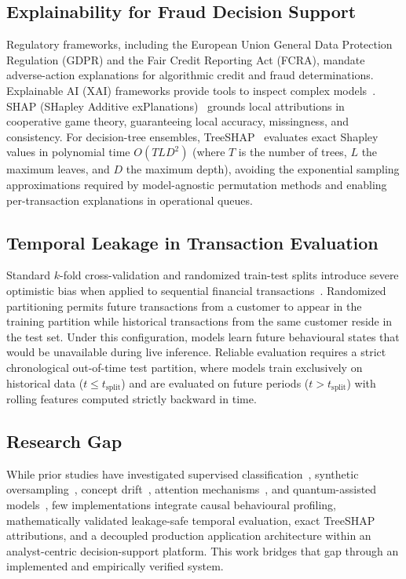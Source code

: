 \documentclass[conference]{IEEEtran}
\begin{document}
\subsection{Explainability for Fraud Decision Support}
Regulatory frameworks, including the European Union General Data Protection Regulation (GDPR) and the Fair Credit Reporting Act (FCRA), mandate adverse-action explanations for algorithmic credit and fraud determinations. Explainable AI (XAI) frameworks provide tools to inspect complex models~\cite{lipton2016mythos}. SHAP (SHapley Additive exPlanations)~\cite{lundberg2017unified} grounds local attributions in cooperative game theory, guaranteeing local accuracy, missingness, and consistency. For decision-tree ensembles, TreeSHAP~\cite{lundberg2020local} evaluates exact Shapley values in polynomial time $O(T L D^2)$ (where $T$ is the number of trees, $L$ the maximum leaves, and $D$ the maximum depth), avoiding the exponential sampling approximations required by model-agnostic permutation methods and enabling per-transaction explanations in operational queues.

\subsection{Temporal Leakage in Transaction Evaluation}
Standard $k$-fold cross-validation and randomized train-test splits introduce severe optimistic bias when applied to sequential financial transactions~\cite{jurgovsky2018sequence}. Randomized partitioning permits future transactions from a customer to appear in the training partition while historical transactions from the same customer reside in the test set. Under this configuration, models learn future behavioural states that would be unavailable during live inference. Reliable evaluation requires a strict chronological out-of-time test partition, where models train exclusively on historical data ($t \le t_{\text{split}}$) and are evaluated on future periods ($t > t_{\text{split}}$) with rolling features computed strictly backward in time.

\subsection{Research Gap}
While prior studies have investigated supervised classification~\cite{han2025enhanced}, synthetic oversampling~\cite{damanik2025advanced}, concept drift~\cite{allawati2025integrated}, attention mechanisms~\cite{wang2025intent}, and quantum-assisted models~\cite{neto2026fraud}, few implementations integrate causal behavioural profiling, mathematically validated leakage-safe temporal evaluation, exact TreeSHAP attributions, and a decoupled production application architecture within an analyst-centric decision-support platform. This work bridges that gap through an implemented and empirically verified system.
\end{document}

